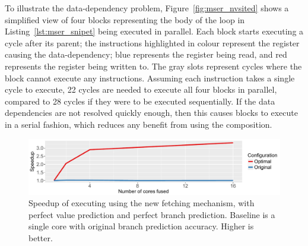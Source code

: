 
To illustrate the data-dependency problem, Figure~\ref{fig:mser_nvsited} shows a simplified view of four blocks representing the body of the loop in Listing~\ref{lst:mser_snipet} being executed in parallel.
Each block starts executing a cycle after its parent; the instructions highlighted in colour represent the register causing the data-dependency; blue represents the register being read, and red represents the register being written to.
The gray slots represent cycles where the block cannot execute any instructions.
Assuming each instruction takes a single cycle to execute, 22 cycles are needed to execute all four blocks in parallel, compared to 28 cycles if they were to be executed sequentially.
If the data dependencies are not resolved quickly enough, then this causes blocks to execute in a serial fashion, which reduces any benefit from using the composition.

\begin{figure}[t]
    \centering
    \includegraphics[width=1\textwidth]{chapter3/graphics/mser_motiv_reg2.pdf}
    \caption{Speedup of executing  using the new fetching mechanism, with perfect value prediction and perfect branch prediction. Baseline is a single core with original branch prediction accuracy. Higher is better.}
    \label{fig:motivation_reg}
	\vspace{1em}
\end{figure}


